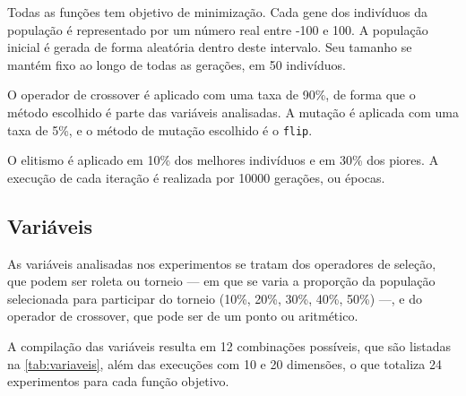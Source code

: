 Todas as funções tem objetivo de minimização.
Cada gene dos indivíduos da população é representado por um número real entre -100 e 100.
A população inicial é gerada de forma aleatória dentro deste intervalo.
Seu tamanho se mantém fixo ao longo de todas as gerações, em 50 indivíduos.

O operador de \gls{crossover} é aplicado com uma taxa de 90\%, de forma que o método escolhido é parte das variáveis analisadas.
A mutação é aplicada com uma taxa de 5\%, e o método de mutação escolhido é o \texttt{flip}.

O elitismo é aplicado em 10\% dos melhores indivíduos e em 30\% dos piores.
A execução de cada iteração é realizada por 10000 gerações, ou épocas.

\subsection{Variáveis}

As variáveis analisadas nos experimentos se tratam dos operadores de seleção, que podem ser roleta ou torneio --- em que se varia a proporção da população selecionada para participar do torneio (10\%, 20\%, 30\%, 40\%, 50\%) ---, e do operador de \gls{crossover}, que pode ser de um ponto ou aritmético.

A compilação das variáveis resulta em 12 combinações possíveis, que são listadas na \autoref{tab:variaveis}, além das execuções com 10 e 20 dimensões, o que totaliza 24 experimentos para cada função objetivo.

